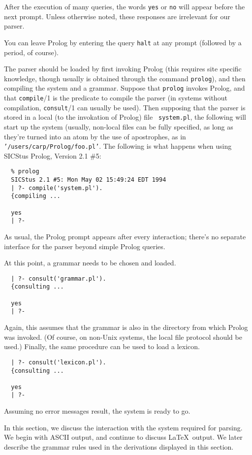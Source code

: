 After the execution of many queries, the words {\tt yes} or {\tt no} will
appear before the next prompt.  Unless otherwise noted, these responses
are irrelevant for our parser.

You can leave Prolog by entering the query {\tt halt} at any prompt
(followed by a period, of course).



The parser should be loaded by first invoking Prolog (this requires
site specific knowledge, though usually is obtained through the
command {\tt prolog}), and then compiling the system and a grammar.
Suppose that {\tt prolog} invokes Prolog, and that {\tt compile}/1 is
the predicate to compile the parser (in systems without compilation,
{\tt consult}/1 can usually be used).  Then supposing that the parser
is stored in a local (to the invokation of Prolog) file {\tt
system.pl}, the following will start up the system (usually, non-local
files can be fully specified, as long as they're turned into an atom
by the use of apostrophes, as in {\tt '/users/carp/Prolog/foo.pl'}.
The following is what happens when using SICStus Prolog, Version 2.1
\#5:
%
\begin{verbatim}
  % prolog
  SICStus 2.1 #5: Mon May 02 15:49:24 EDT 1994
  | ?- compile('system.pl').
  {compiling ...

  yes
  | ?- 
\end{verbatim}
%
As usual, the Prolog prompt appears after every interaction;  there's
no separate interface for the parser beyond simple Prolog queries.

At this point, a grammar needs to be chosen and loaded.  
\begin{verbatim}
  | ?- consult('grammar.pl').
  {consulting ...

  yes
  | ?- 
\end{verbatim}
%
Again, this assumes that the grammar is also in the directory from
which Prolog was invoked.  (Of course, on non-Unix systems, the local
file protocol should be used.)  Finally, the same procedure can be
used to load a lexicon.
%
\begin{verbatim}
  | ?- consult('lexicon.pl').
  {consulting ...

  yes
  | ?- 
\end{verbatim}
%
Assuming no error messages result, the system is ready to go.



In this section, we discuss the interaction with the system required
for parsing.  We begin with ASCII output, and continue to discuss
\LaTeX\ output.  We later describe the grammar rules used in the
derivations displayed in this section.

